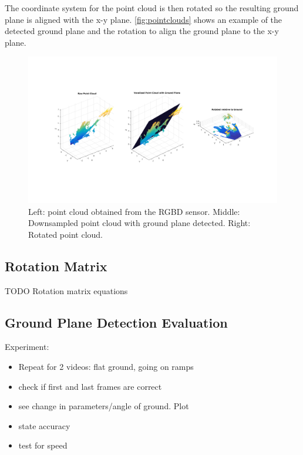 The coordinate system for the point cloud is then rotated so the resulting
ground plane is aligned with the x-y plane. \autoref{fig:pointclouds} shows an
example of the detected ground plane and the rotation to align the ground plane
to the x-y plane.

\begin{figure}
\centering
\includegraphics[width=6in]{figures/pointclouds.png}
\caption{Left: point cloud obtained from the RGBD sensor. Middle:
Downsampled point cloud with ground plane detected. Right: Rotated point cloud.}
\label{fig:pointclouds}
\end{figure}

\subsection{Rotation Matrix}
TODO Rotation matrix equations

\subsection{Ground Plane Detection Evaluation}
Experiment: 
\begin{itemize}
\item Repeat for 2 videos: flat ground, going on ramps
\item check if first and last frames are correct
\item see change in parameters/angle of ground. Plot
\item state accuracy
\item test for speed
\end{itemize}

